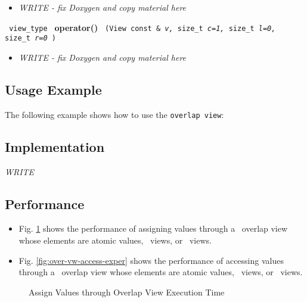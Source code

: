 \begin{itemize}
\item
\textit{WRITE - fix Doxygen and copy material here}
\end{itemize}

\noindent
\texttt{%
view\_type
}
\newline
\textbf{operator()}%
\texttt{%
(View const \&
\textit{v,}%
size\_t
\textit{c=1,}%
size\_t
\textit{l=0,}%
size\_t
\textit{r=0}%
)
}

\begin{itemize}
\item
\textit{WRITE - fix Doxygen and copy material here}
\end{itemize}

\subsection{Usage Example} \label{sec-over-vw-use}

The following example shows how to use the \texttt{overlap view}:


\subsection{Implementation} \label{sec-over-vw-impl}

\textit{WRITE}

\subsection{Performance} \label{sec-over-vw-perf}

\begin{itemize}
\item
Fig. \ref{fig:over-vw-assign-exper}
shows the performance of assigning values through a \stapl\ overlap view
whose elements are atomic values, \stl\ views, or \stapl\ views.
\item
Fig. \ref{fig:over-vw-access-exper}
shows the performance of accessing values through a \stapl\ overlap view
whose elements are atomic values, \stl\ views, or \stapl\ views.
\end{itemize}

\begin{figure}[p]
\caption{Assign Values through Overlap View Execution Time}
\label{fig:over-vw-assign-exper}
\end{figure}

